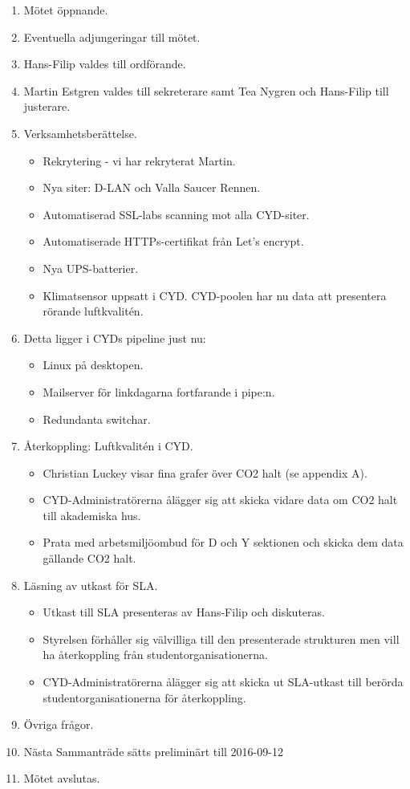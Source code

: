 \documentclass[a4paper,12pt]{article}
\begin{document}
\begin{enumerate}
\item Mötet öppnande.
\item Eventuella adjungeringar till mötet.
\item Hans-Filip valdes till ordförande.
\item Martin Estgren valdes till sekreterare samt Tea Nygren och Hans-Filip till justerare.
\item Verksamhetsberättelse.
\begin{itemize}
\item Rekrytering - vi har rekryterat Martin.
\item Nya siter: D-LAN och Valla Saucer Rennen.
\item Automatiserad SSL-labs scanning mot alla CYD-siter.
\item Automatiserade HTTPs-certifikat från Let's encrypt.
\item Nya UPS-batterier.
\item Klimatsensor uppsatt i CYD. CYD-poolen har nu data att presentera rörande luftkvalitén.
\end{itemize}
\newpage
\item Detta ligger i CYDs pipeline just nu:
\begin{itemize}
\item Linux på desktopen.
\item Mailserver för linkdagarna fortfarande i pipe:n.
\item Redundanta switchar.
\end{itemize}
\item Återkoppling: Luftkvalitén i CYD.
\begin{itemize}
\item Christian Luckey visar fina grafer över CO2 halt (se appendix A).
\item CYD-Administratörerna ålägger sig att skicka vidare data om CO2 halt till akademiska hus.
\item Prata med arbetsmiljöombud för D och Y sektionen och skicka dem data gällande CO2 halt.
\end{itemize}
\item Läsning av utkast för SLA.
\begin{itemize}
\item Utkast till SLA presenteras av Hans-Filip och diskuteras.
\item Styrelsen förhåller sig välvilliga till den presenterade strukturen men vill ha återkoppling från studentorganisationerna.
\item CYD-Administratörerna ålägger sig att skicka ut SLA-utkast till berörda studentorganisationerna för återkoppling.
\end{itemize}
\item Övriga frågor.
\item Nästa Sammanträde sätts preliminärt till 2016-09-12
\item Mötet avslutas.
\end{enumerate}
\end{document}
